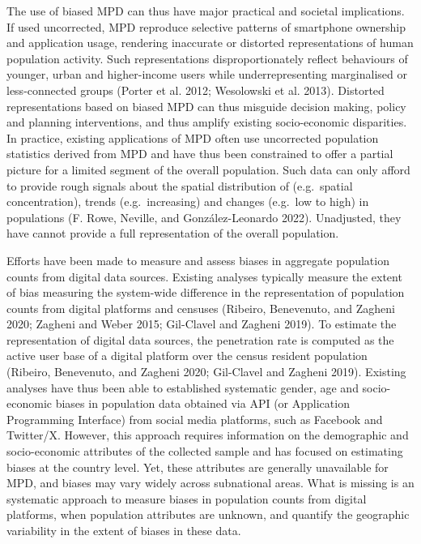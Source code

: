 \documentclass{article}
\begin{document}
The use of biased MPD can thus have major practical and societal
implications. If used uncorrected, MPD reproduce selective patterns of
smartphone ownership and application usage, rendering inaccurate or
distorted representations of human population activity. Such
representations disproportionately reflect behaviours of younger, urban
and higher-income users while underrepresenting marginalised or
less-connected groups (Porter et al. 2012; Wesolowski et al. 2013). Distorted
representations based on biased MPD can thus misguide decision making,
policy and planning interventions, and thus amplify existing
socio-economic disparities. In practice, existing applications of MPD
often use uncorrected population statistics derived from MPD and have
thus been constrained to offer a partial picture for a limited segment
of the overall population. Such data can only afford to provide rough
signals about the spatial distribution of (e.g.~spatial concentration),
trends (e.g.~increasing) and changes (e.g.~low to high) in populations
(F. Rowe, Neville, and González-Leonardo 2022). Unadjusted, they have cannot provide a full
representation of the overall population.

Efforts have been made to measure and assess biases in aggregate
population counts from digital data sources. Existing analyses typically
measure the extent of bias measuring the system-wide difference in the
representation of population counts from digital platforms and censuses
(Ribeiro, Benevenuto, and Zagheni 2020; Zagheni and Weber 2015; Gil-Clavel and Zagheni 2019). To estimate the
representation of digital data sources, the penetration rate is computed
as the active user base of a digital platform over the census resident
population (Ribeiro, Benevenuto, and Zagheni 2020; Gil-Clavel and Zagheni 2019). Existing analyses
have thus been able to established systematic gender, age and
socio-economic biases in population data obtained via API (or
Application Programming Interface) from social media platforms, such as
Facebook and Twitter/X. However, this approach requires information on
the demographic and socio-economic attributes of the collected sample
and has focused on estimating biases at the country level. Yet, these
attributes are generally unavailable for MPD, and biases may vary widely
across subnational areas. What is missing is an systematic approach to
measure biases in population counts from digital platforms, when
population attributes are unknown, and quantify the geographic
variability in the extent of biases in these data.
\end{document}
